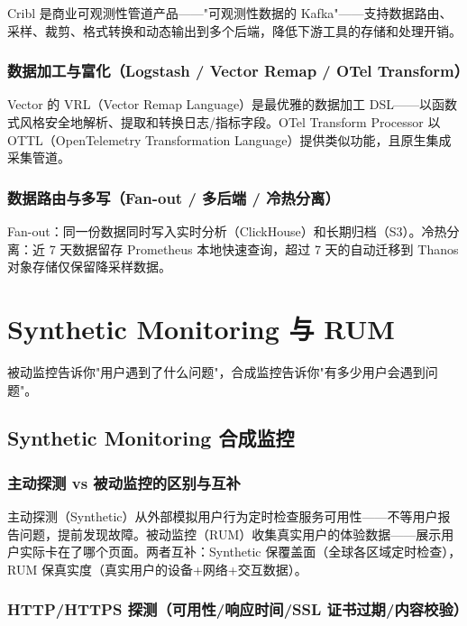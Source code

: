 \documentclass[12pt,UTF8]{ctexbook}
\begin{document}
Cribl 是商业可观测性管道产品——"可观测性数据的 Kafka"——支持数据路由、采样、裁剪、格式转换和动态输出到多个后端，降低下游工具的存储和处理开销。

    \subsection{数据加工与富化（Logstash / Vector Remap / OTel Transform）}

Vector 的 VRL（Vector Remap Language）是最优雅的数据加工 DSL——以函数式风格安全地解析、提取和转换日志/指标字段。OTel Transform Processor 以 OTTL（OpenTelemetry Transformation Language）提供类似功能，且原生集成采集管道。

    \subsection{数据路由与多写（Fan-out / 多后端 / 冷热分离）}

Fan-out：同一份数据同时写入实时分析（ClickHouse）和长期归档（S3）。冷热分离：近 7 天数据留存 Prometheus 本地快速查询，超过 7 天的自动迁移到 Thanos 对象存储仅保留降采样数据。


\chapter{Synthetic Monitoring 与 RUM}
\label{chap:synthetic-rum}

被动监控告诉你"用户遇到了什么问题"，合成监控告诉你"有多少用户会遇到问题"。

  \section{Synthetic Monitoring 合成监控}
    \subsection{主动探测 vs 被动监控的区别与互补}

主动探测（Synthetic）从外部模拟用户行为定时检查服务可用性——不等用户报告问题，提前发现故障。被动监控（RUM）收集真实用户的体验数据——展示用户实际卡在了哪个页面。两者互补：Synthetic 保覆盖面（全球各区域定时检查），RUM 保真实度（真实用户的设备+网络+交互数据）。

    \subsection{HTTP/HTTPS 探测（可用性/响应时间/SSL 证书过期/内容校验）}
\end{document}
